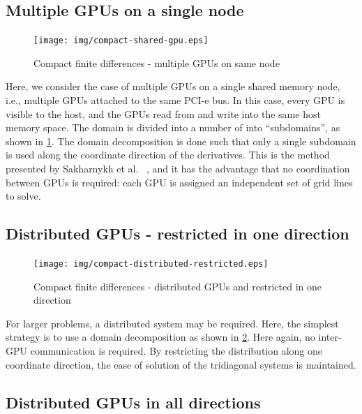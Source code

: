 \subsection{Multiple GPUs on a single node}

\begin{figure}
\begin{center}
\texttt{[image: img/compact-shared-gpu.eps]}
\caption{Compact finite differences - multiple GPUs
    on same node}
\label{fig:compact-shared-gpu}
\end{center}
\end{figure}

Here, we consider the case of multiple GPUs
on a single shared memory node, i.e.,
multiple GPUs attached to the same PCI-e bus.
In this case, every GPU is visible to the host,
and the GPUs read from and write into
the same host memory space.
The domain is divided into a number of
into ``subdomains'',
as shown in \ref{fig:compact-shared-gpu}.
The domain decomposition is done such that
only a single subdomain is used along the
coordinate direction of the derivatives.
This is the method presented by
Sakharnykh et al. ~\cite{sakharnykhADIconf},
and it has the advantage that
no coordination between GPUs is required:
each GPU is assigned an independent
set of grid lines to solve.

\subsection{Distributed GPUs - restricted in one direction}

\begin{figure}
\begin{center}
\texttt{[image: img/compact-distributed-restricted.eps]}
\caption{Compact finite differences - distributed GPUs and
    restricted in one direction}
\label{fig:compact-distributed-restricted}
\end{center}
\end{figure}

For larger problems,
a distributed system may be required.
Here, the simplest strategy is to use a domain decomposition
as shown in \ref{fig:compact-distributed-restricted}.
Here again, 
no inter-GPU communication is required.
By restricting the distribution along one coordinate direction,
the ease of solution of the tridiagonal systems is maintained.

\subsection{Distributed GPUs in all directions}

